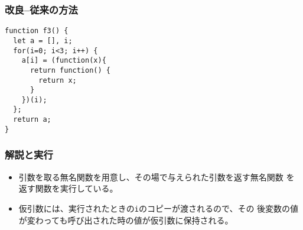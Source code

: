 \begin{frame}[containsverbatim]
\frametitle{改良--従来の方法}
 \begin{Verbatim}
function f3() {
  let a = [], i;
  for(i=0; i<3; i++) {
    a[i] = (function(x){
      return function() {
        return x;
      }
    })(i);
  };
  return a;
}
 \end{Verbatim}
\end{frame}
\begin{frame}[containsverbatim]
\frametitle{解説と実行}
\begin{itemize}
 \item 引数を取る無名関数を用意し、その場で与えられた引数を返す無名関数
       を返す関数を実行している。
 \item 仮引数には、実行されたときの\Verb+i+のコピーが渡されるので、その
       後変数の値が変わっても呼び出された時の値が仮引数に保持される。
\end{itemize}
\end{frame}
